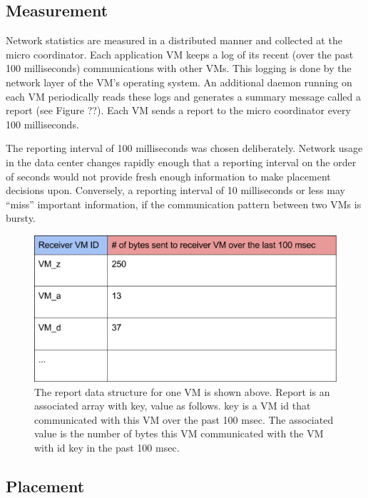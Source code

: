 \documentclass[11pt]{article}
\begin{document}
\subsection{Measurement}

Network statistics are measured in a distributed manner and collected at the micro coordinator.  Each application VM keeps a log of its recent (over the past 100 milliseconds) communications with other VMs.  This logging is done by the network layer of the VM’s operating system.  An additional daemon running on each VM periodically reads these logs and generates a summary message called a report (see Figure ??).  Each VM sends a report to the micro coordinator every 100 milliseconds.

The reporting interval of 100 milliseconds was chosen deliberately.  Network usage in the data center changes rapidly enough that a reporting interval on the order of seconds would not provide fresh enough information to make placement decisions upon.  Conversely, a reporting interval of 10 milliseconds or less may “miss” important information, if the communication pattern between two VMs is bursty.

\begin{figure}
  \centering
\includegraphics[scale=0.65]{measurement.png}

 \caption{The report data structure for one VM is shown above. Report is an associated array with key, value as follows. key is a VM id that communicated with this VM over the past 100 msec. The associated value is the number of bytes this VM communicated with the VM with id key in the past 100 msec.}
 
\end{figure}

\subsection{Placement}
\end{document}
